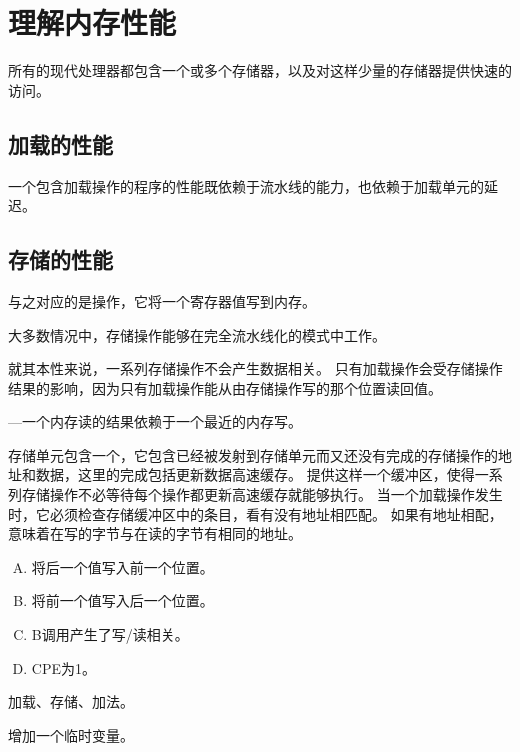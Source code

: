 
\section{理解内存性能}
{
    所有的现代处理器都包含一个或多个存储器，以及对这样少量的存储器提供快速的访问。

    \subsection{加载的性能}
    {
        一个包含加载操作的程序的性能既依赖于流水线的能力，也依赖于加载单元的延迟。
    }

    \subsection{存储的性能}
    {
        与之对应的是操作，它将一个寄存器值写到内存。

        大多数情况中，存储操作能够在完全流水线化的模式中工作。

        就其本性来说，一系列存储操作不会产生数据相关。
        只有加载操作会受存储操作结果的影响，因为只有加载操作能从由存储操作写的那个位置读回值。

        ---一个内存读的结果依赖于一个最近的内存写。

        存储单元包含一个，它包含已经被发射到存储单元而又还没有完成的存储操作的地址和数据，这里的完成包括更新数据高速缓存。
        提供这样一个缓冲区，使得一系列存储操作不必等待每个操作都更新高速缓存就能够执行。
        当一个加载操作发生时，它必须检查存储缓冲区中的条目，看有没有地址相匹配。
        如果有地址相配，意味着在写的字节与在读的字节有相同的地址。

        \begin{practicec}
            \begin{enumerate}[A.]
                \item 将后一个值写入前一个位置。
                \item 将前一个值写入后一个位置。
                \item B调用产生了写/读相关。
                \item CPE为1。
            \end{enumerate}
        \end{practicec}

        \begin{practicec}
            加载、存储、加法。
        \end{practicec}

        \begin{practicec}
            增加一个临时变量。
        \end{practicec}
    }
}
